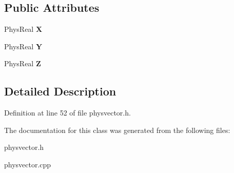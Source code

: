 \subsection*{Public Attributes}
\begin{DoxyCompactItemize}
\item 
\hypertarget{classPhysVector3_ac4586254a6116c616046bd9d5b35ca31}{
PhysReal {\bfseries X}}
\label{da/d11/classPhysVector3_ac4586254a6116c616046bd9d5b35ca31}

\item 
\hypertarget{classPhysVector3_a9bf4609392a492c2b3e278d635ed976a}{
PhysReal {\bfseries Y}}
\label{da/d11/classPhysVector3_a9bf4609392a492c2b3e278d635ed976a}

\item 
\hypertarget{classPhysVector3_a0c0585976cb4c215626e205a2c663226}{
PhysReal {\bfseries Z}}
\label{da/d11/classPhysVector3_a0c0585976cb4c215626e205a2c663226}

\end{DoxyCompactItemize}


\subsection{Detailed Description}


Definition at line 52 of file physvector.h.

The documentation for this class was generated from the following files:\begin{DoxyCompactItemize}
\item 
physvector.h\item 
physvector.cpp\end{DoxyCompactItemize}
